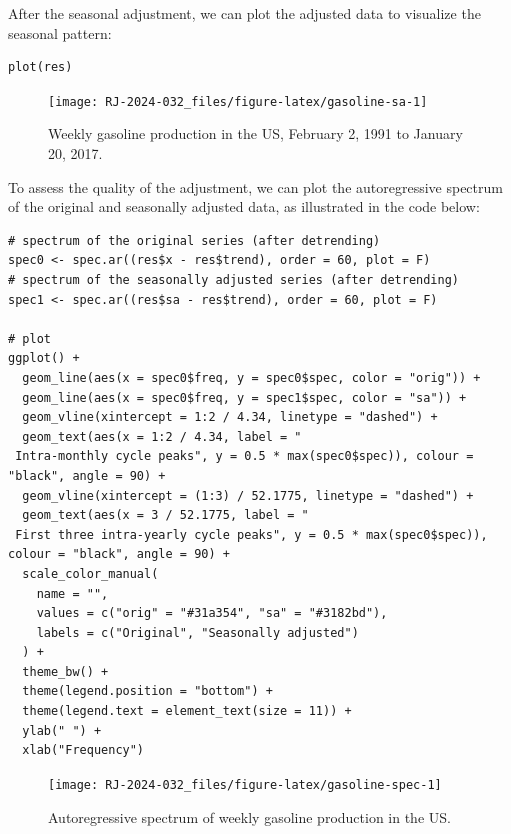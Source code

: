 After the seasonal adjustment, we can plot the adjusted data to visualize the seasonal pattern:

\begin{verbatim}
plot(res)
\end{verbatim}

\begin{figure}[H]

{\centering \texttt{[image: RJ-2024-032\_files/figure-latex/gasoline-sa-1]} 

}

\caption{Weekly gasoline production in the US, February 2, 1991 to January 20, 2017.}\label{fig:gasoline-sa}
\end{figure}

To assess the quality of the adjustment, we can plot the autoregressive spectrum of the original and seasonally adjusted data, as illustrated in the code below:

\begin{verbatim}
# spectrum of the original series (after detrending)
spec0 <- spec.ar((res$x - res$trend), order = 60, plot = F)
# spectrum of the seasonally adjusted series (after detrending)
spec1 <- spec.ar((res$sa - res$trend), order = 60, plot = F)

# plot
ggplot() +
  geom_line(aes(x = spec0$freq, y = spec0$spec, color = "orig")) +
  geom_line(aes(x = spec0$freq, y = spec1$spec, color = "sa")) +
  geom_vline(xintercept = 1:2 / 4.34, linetype = "dashed") +
  geom_text(aes(x = 1:2 / 4.34, label = "
 Intra-monthly cycle peaks", y = 0.5 * max(spec0$spec)), colour = "black", angle = 90) +
  geom_vline(xintercept = (1:3) / 52.1775, linetype = "dashed") +
  geom_text(aes(x = 3 / 52.1775, label = "
 First three intra-yearly cycle peaks", y = 0.5 * max(spec0$spec)), colour = "black", angle = 90) +
  scale_color_manual(
    name = "",
    values = c("orig" = "#31a354", "sa" = "#3182bd"),
    labels = c("Original", "Seasonally adjusted")
  ) +
  theme_bw() +
  theme(legend.position = "bottom") +
  theme(legend.text = element_text(size = 11)) +
  ylab(" ") +
  xlab("Frequency")
\end{verbatim}

\begin{figure}[H]

{\centering \texttt{[image: RJ-2024-032\_files/figure-latex/gasoline-spec-1]} 

}

\caption{Autoregressive spectrum of weekly gasoline production in the US.}\label{fig:gasoline-spec}
\end{figure}


